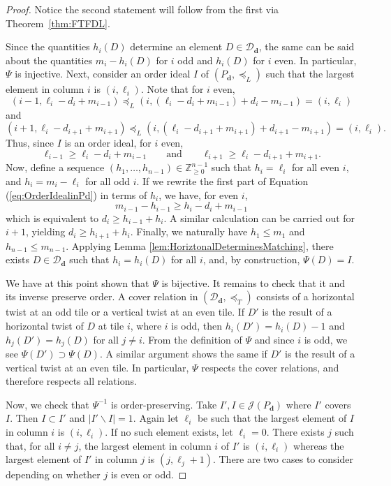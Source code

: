 \documentclass{amsart}
\theoremstyle{definition}
\begin{document}
 \begin{proof}
Notice the second statement will follow from the first via Theorem~\ref{thm:FTFDL}.

Since the quantities $h_i(D)$ determine an element $D \in \mathcal{D}_{\mathbf{d}}$, the same can be said about the quantities $m_i-h_i(D)$ for $i$ odd and $h_i(D)$ for $i$ even. In particular, $\Psi$ is injective. Next, consider an order ideal $I$ of $(P_{\mathbf{d}},\preceq_L)$ such that the largest element in column $i$ is $(i,\ell_i)$. Note that for $i$ even, $$(i-1,\ell_i-d_i+m_{i-1})\preceq_L(i,(\ell_i-d_i+m_{i-1})+d_i-m_{i-1})=(i,\ell_i)$$ and $$(i+1,\ell_i-d_{i+1}+m_{i+1})\preceq_L(i,(\ell_i-d_{i+1}+m_{i+1})+d_{i+1}-m_{i+1})=(i,\ell_i).$$ Thus, since $I$ is an order ideal, for $i$ even,
\begin{equation}
\ell_{i-1}\geq \ell_{i} - d_i + m_{i-1}\qquad\text{and}\qquad\ell_{i+1} \geq \ell_{i} - d_{i+1} + m_{i+1}.\label{eq:OrderIdealinPd}
\end{equation}
Now, define a sequence $(h_1,\ldots,h_{n-1}) \in \mathbb{Z}_{\ge 0}^{n-1}$ such that $h_i = \ell_i$ for all even $i$, and $h_i = m_i - \ell_i$ for all odd $i$. If we rewrite the first part of Equation (\ref{eq:OrderIdealinPd}) in terms of $h_i$, we have, for even $i$, \[
m_{i-1} - h_{i-1} \geq h_i - d_i + m_{i-1}
\]
which is equivalent to $d_i \geq h_{i-1} + h_i$. A similar calculation can be carried out for $i+1$, yielding $d_i \geq h_{i+1} + h_i$. Finally, we naturally have $h_1 \leq m_1$ and $h_{n-1} \leq m_{n-1}$. Applying Lemma \ref{lem:HoriztonalDeterminesMatching}, there exists $D \in \mathcal{D}_{\mathbf{d}}$ such that $h_i = h_i(D)$ for all $i$, and, by construction, $\Psi(D) = I$.

We have at this point shown that $\Psi$ is bijective. It remains to check that it and its inverse preserve order. A cover relation in $(\mathcal{D}_{\mathbf{d}},\preceq_T)$ consists of a horizontal twist at an odd tile or a vertical twist at an even tile. If $D'$ is the result of a horizontal twist of $D$ at tile $i$, where $i$ is odd, then $h_i(D') = h_i(D) - 1$ and $h_j(D') = h_j(D)$ for all $j \neq i$. From the definition of $\Psi$ and since $i$ is odd, we see $\Psi(D') \supset \Psi(D)$. A similar argument shows the same if $D'$ is the result of a vertical twist at an even tile. In particular, $\Psi$ respects the cover relations, and therefore respects all relations. 

{Now, we check that $\Psi^{-1}$ is order-preserving. Take $I',I\in\mathcal{J}(P_\mathbf{d})$ where $I'$ covers $I$. Then $I\subset I'$ and $|I'\backslash I|=1$. Again let $\ell_i$ be such that  the largest element of $I$ in column $i$ is $(i,\ell_i)$. If no such element exists, let $\ell_i =0$. There exists $j$ such that, for all $i \neq j$, the largest element in column $i$ of $I'$ is $(i,\ell_i)$ whereas the largest element of $I'$ in column $j$ is $(j,\ell_j+1)$. There are two cases to consider depending on whether $j$ is even or odd.
\bigskip

}
\end{proof}
\end{document}
